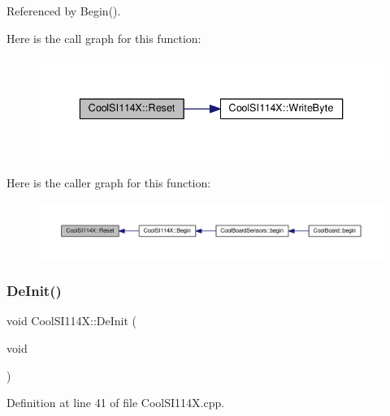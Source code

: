 Referenced by Begin().

Here is the call graph for this function\+:\nopagebreak
\begin{figure}[H]
\begin{center}
\leavevmode
\includegraphics[width=336pt]{dd/d67/class_cool_s_i114_x_a9d9f9c9129c0c29ed497f8563f3dd823_cgraph}
\end{center}
\end{figure}
Here is the caller graph for this function\+:\nopagebreak
\begin{figure}[H]
\begin{center}
\leavevmode
\includegraphics[width=350pt]{dd/d67/class_cool_s_i114_x_a9d9f9c9129c0c29ed497f8563f3dd823_icgraph}
\end{center}
\end{figure}
\mbox{\label{class_cool_s_i114_x_a6840abd53a2e3d71a6bb918077c6d6e6}} 
\subsubsection{\texorpdfstring{De\+Init()}{DeInit()}}
{\footnotesize\ttfamily void Cool\+S\+I114\+X\+::\+De\+Init (\begin{DoxyParamCaption}\item[{void}]{ }\end{DoxyParamCaption})}



Definition at line 41 of file Cool\+S\+I114\+X.\+cpp.



